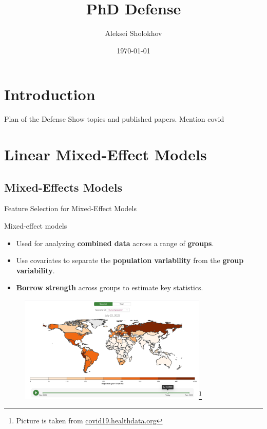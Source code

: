 \documentclass[8pt]{beamer}
\title{PhD Defense}
\date{\today}
\author{Aleksei Sholokhov}
\begin{document}
\maketitle

\section{Introduction}
\begin{frame}{Plan of the Defense}
Show topics and published papers. Mention covid
	
\end{frame}

\section{Linear Mixed-Effect Models}
\subsection{ Mixed-Effects Models}
\begin{frame}{Feature Selection for Mixed-Effect Models}

Mixed-effect models
\begin{itemize}
	\item Used for analyzing \textbf{combined data} across a range of \textbf{groups}.
	\item Use covariates to separate the \textbf{population variability} from the \textbf{group variability}.
	\item \textbf{Borrow strength} across groups to estimate key statistics. %
\end{itemize}

\begin{figure}
	\centering
	\includegraphics[width=0.8\textwidth]{Figures/ihme_predictions.png}\footnote{Picture is taken from \href{covid19.healthdata.org}{covid19.healthdata.org} }
\end{figure}

\end{frame}
\end{document}
